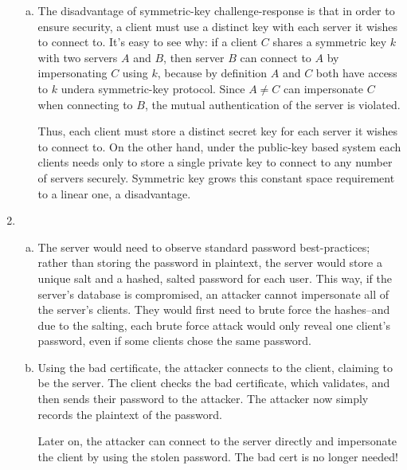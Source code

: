 \documentclass{article}[12pt]
\begin{document}
\begin{enumerate}[1.]
\begin{enumerate}[(a)]

\item The disadvantage of symmetric-key challenge-response is that in order to ensure security, a client must use a distinct key with each server it wishes to connect to. It's easy to see why: if a client $C$ shares a symmetric key $k$ with two servers $A$ and $B$, then server $B$ can connect to $A$ by impersonating $C$ using $k$, because by definition $A$ and $C$ both have access to $k$ undera symmetric-key protocol. Since $A \ne C$ can impersonate $C$ when connecting to $B$, the mutual authentication of the server is violated.

Thus, each client must store a distinct secret key for each server it wishes to connect to. On the other hand, under the public-key based system each clients needs only to store a single private key to connect to any number of servers securely. Symmetric key grows this constant space requirement to a linear one, a disadvantage.
\end{enumerate}

\item

\begin{enumerate}[(a)]
\item The server would need to observe standard password best-practices; rather than storing the password in plaintext, the server would store a unique salt and a hashed, salted password for each user. This way, if the server's database is compromised, an attacker cannot impersonate all of the server's clients. They would first need to brute force the hashes--and due to the salting, each brute force attack would only reveal one client's password, even if some clients chose the same password.

\item Using the bad certificate, the attacker connects to the client, claiming to be the server. The client checks the bad certificate, which validates, and then sends their password to the attacker. The attacker now simply records the plaintext of the password.

Later on, the attacker can connect to the server directly and impersonate the client by using the stolen password. The bad cert is no longer needed!
\end{enumerate}

\end{enumerate}
\end{document}
